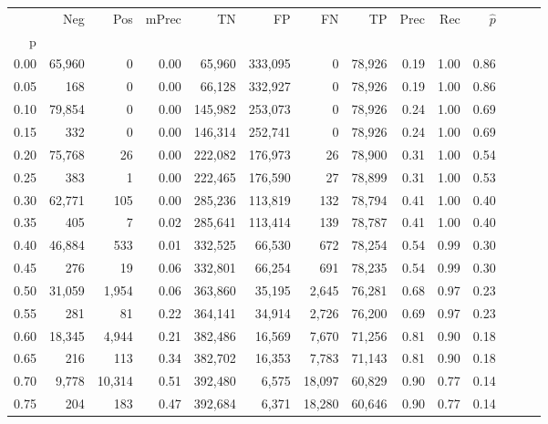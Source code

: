\begin{tabular}{rrrrrrrrrrrrrr}
\toprule
{} &     Neg &     Pos & mPrec &       TN &       FP &      FN &      TP &  Prec &   Rec & $\hat{p}$ \\
p    &         &         &       &          &          &         &         &       &       &           \\
\midrule
0.00 &  65,960 &       0 &  0.00 &   65,960 &  333,095 &       0 &  78,926 &  0.19 &  1.00 &      0.86 \\
0.05 &     168 &       0 &  0.00 &   66,128 &  332,927 &       0 &  78,926 &  0.19 &  1.00 &      0.86 \\
0.10 &  79,854 &       0 &  0.00 &  145,982 &  253,073 &       0 &  78,926 &  0.24 &  1.00 &      0.69 \\
0.15 &     332 &       0 &  0.00 &  146,314 &  252,741 &       0 &  78,926 &  0.24 &  1.00 &      0.69 \\
0.20 &  75,768 &      26 &  0.00 &  222,082 &  176,973 &      26 &  78,900 &  0.31 &  1.00 &      0.54 \\
0.25 &     383 &       1 &  0.00 &  222,465 &  176,590 &      27 &  78,899 &  0.31 &  1.00 &      0.53 \\
0.30 &  62,771 &     105 &  0.00 &  285,236 &  113,819 &     132 &  78,794 &  0.41 &  1.00 &      0.40 \\
0.35 &     405 &       7 &  0.02 &  285,641 &  113,414 &     139 &  78,787 &  0.41 &  1.00 &      0.40 \\
0.40 &  46,884 &     533 &  0.01 &  332,525 &   66,530 &     672 &  78,254 &  0.54 &  0.99 &      0.30 \\
0.45 &     276 &      19 &  0.06 &  332,801 &   66,254 &     691 &  78,235 &  0.54 &  0.99 &      0.30 \\
0.50 &  31,059 &   1,954 &  0.06 &  363,860 &   35,195 &   2,645 &  76,281 &  0.68 &  0.97 &      0.23 \\
0.55 &     281 &      81 &  0.22 &  364,141 &   34,914 &   2,726 &  76,200 &  0.69 &  0.97 &      0.23 \\
0.60 &  18,345 &   4,944 &  0.21 &  382,486 &   16,569 &   7,670 &  71,256 &  0.81 &  0.90 &      0.18 \\
0.65 &     216 &     113 &  0.34 &  382,702 &   16,353 &   7,783 &  71,143 &  0.81 &  0.90 &      0.18 \\
0.70 &   9,778 &  10,314 &  0.51 &  392,480 &    6,575 &  18,097 &  60,829 &  0.90 &  0.77 &      0.14 \\
0.75 &     204 &     183 &  0.47 &  392,684 &    6,371 &  18,280 &  60,646 &  0.90 &  0.77 &      0.14 \\

\end{tabular}
